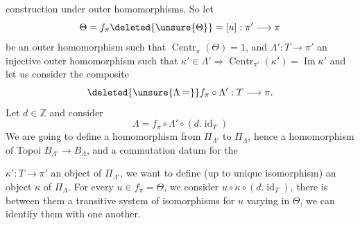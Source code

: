 construction under outer homomorphisms. So let
\[
\Theta=f_\pi\deleted{\unsure{\Theta}}=[u]:\pi'\longrightarrow\pi
\]
be an outer homomorphism such that \(\operatorname{Centr}_\pi(\Theta)=1\),
and \(\Lambda':T\longrightarrow\pi'\) an injective outer homomorphism
such that \(\kappa'\in\Lambda'\Rightarrow\operatorname{Centr}_{\pi'}(\kappa')=\operatorname{Im}\kappa'\)
and let us consider the composite
\[
\deleted{\unsure{\Lambda=}}f_\pi\circ\Lambda':T\longrightarrow\pi.
\]
Let \(d\in\mathbb Z\) and consider
\[
\Lambda=f_\pi\circ\Lambda'\circ(d.\operatorname{id}_T)
\]
We are going to define a homomorphism from \(\Pi_{\Lambda'}\) to \(\Pi_\Lambda\),
hence a homomorphism of Topoi \(B_{\Lambda'}\longrightarrow B_\Lambda\),
and a commutation datum \inserted{\(\alpha\)} for the

 \(\kappa':T\longrightarrow\pi'\) an object of \(\Pi_{\Lambda'}\),
we want to define (up to unique isomorphism) an
object \(\kappa\) of \(\Pi_\Lambda\). For every \(u\in f_\pi=\Theta\),
we consider \(u\circ\kappa\circ(d.\operatorname{id}_T)\), there is between them
a transitive system of isomorphisms for \(u\) varying
in \(\Theta\), we can identify them with one another.


